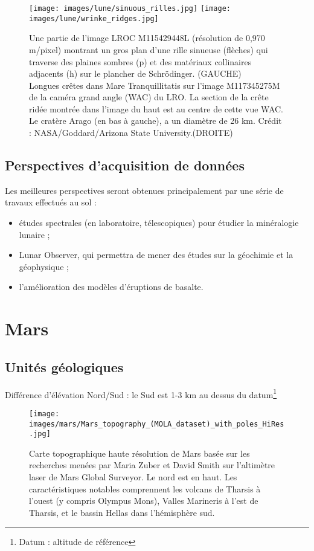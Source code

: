 \documentclass[10pt,a4paper, twocolumns]{article}
\begin{document}
	\begin{figure}[!h]
		\centering
		\texttt{[image: images/lune/sinuous\_rilles.jpg]} 
		\texttt{[image: images/lune/wrinke\_ridges.jpg]} 
		\caption{Une partie de l'image LROC M115429448L (résolution de 0,970 m/pixel) montrant un gros plan d'une rille sinueuse (flèches) qui traverse des plaines sombres (p) et des matériaux collinaires adjacents (h) sur le plancher de Schrödinger. (GAUCHE)\\
		Longues crêtes dans Mare Tranquillitatis sur l'image M117345275M de la caméra grand angle (WAC) du LRO. La section de la crête ridée montrée dans l'image du haut est au centre de cette vue WAC. Le cratère Arago (en bas à gauche), a un diamètre de 26 km. Crédit : NASA/Goddard/Arizona State University.(DROITE)}
	\end{figure}

\subsection{Perspectives d'acquisition de données}

	Les meilleures perspectives seront obtenues principalement par une série de travaux effectués au sol :
	\begin{itemize}
		\item études spectrales (en laboratoire, télescopiques) pour étudier la minéralogie lunaire ;
		\item Lunar Observer, qui permettra de mener des études sur la géochimie et la géophysique ;
		\item l'amélioration des modèles d'éruptions de basalte.
	\end{itemize}

\section{Mars}

\subsection{Unités géologiques}

	Différence d'élévation Nord/Sud : le Sud est 1-3 km au dessus du datum\footnote{Datum : altitude de référence}
	
	\begin{figure}[!h]
		\centering
		\texttt{[image: images/mars/Mars\_topography\_(MOLA\_dataset)\_with\_poles\_HiRes.jpg]}
		\caption{Carte topographique haute résolution de Mars basée sur les recherches menées par Maria Zuber et David Smith sur l'altimètre laser de Mars Global Surveyor. Le nord est en haut. Les caractéristiques notables comprennent les volcans de Tharsis à l'ouest (y compris Olympus Mons), Valles Marineris à l'est de Tharsis, et le bassin Hellas dans l'hémisphère sud.}
	\end{figure}
	
\end{document}
